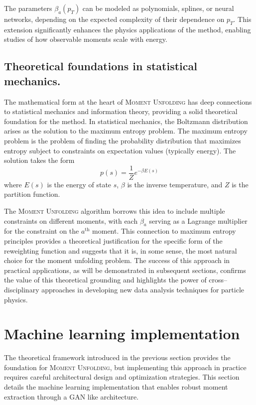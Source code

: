        The parameters $\beta_a(p_T)$ can be modeled as polynomials, splines, or neural networks, depending on the expected complexity of their dependence on $p_T$.
        This extension significantly enhances the physics applications of the method, enabling studies of how observable moments scale with energy.

    \subsection{Theoretical foundations in statistical mechanics.}
        The mathematical form at the heart of \textsc{Moment Unfolding} has deep connections to statistical mechanics and information theory, providing a solid theoretical foundation for the method.
        In statistical mechanics, the Boltzmann distribution arises as the solution to the maximum entropy problem.
        The maximum entropy problem is the problem of finding the probability distribution that maximizes entropy subject to constraints on expectation values (typically energy).
        The solution takes the form
        \[
            p(s) = \frac{1}{Z} e^{-\beta E(s)}
        \]
        where $E(s)$ is the energy of state $s$, $\beta$ is the inverse temperature, and $Z$ is the partition function.

        The \textsc{Moment Unfolding} algorithm borrows this idea to include multiple constraints on different moments, with each $\beta_a$ serving as a Lagrange multiplier for the constraint on the $a^{\text{th}}$ moment.
        This connection to maximum entropy principles provides a theoretical justification for the specific form of the reweighting function and suggests that it is, in some sense, the most natural choice for the moment unfolding problem.
        The success of this approach in practical applications, as will be demonstrated in subsequent sections, confirms the value of this theoretical grounding and highlights the power of cross--disciplinary approaches in developing new data analysis techniques for particle physics.
\section{Machine learning implementation}
    The theoretical framework introduced in the previous section provides the foundation for \textsc{Moment Unfolding}, but implementing this approach in practice requires careful architectural design and optimization strategies.
    This section details the machine learning implementation that enables robust moment extraction through a GAN like architecture.

